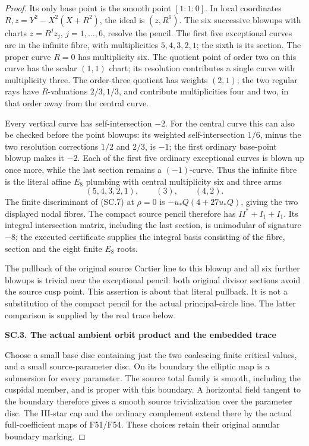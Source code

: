 \begin{proof}
Its only base point is the smooth point \([1:1:0]\). In local coordinates
\(R,z=Y^2-X^2(X+R^2)\), the ideal is \((z,R^6)\). The six successive
blowups with charts \(z=R^jz_j\), \(j=1,\ldots,6\), resolve the
pencil. The first five exceptional curves are in the infinite fibre,
with multiplicities \(5,4,3,2,1\); the sixth is its section. The proper
curve \(R=0\) has multiplicity six. The quotient point of order two on
this curve has the scalar \((1,1)\) chart; its resolution contributes a
single curve with multiplicity three. The order-three quotient has
weights \((2,1)\); the two regular rays have \(R\)-valuations
\(2/3,1/3\), and contribute multiplicities four and two, in that order
away from the central curve.

Every vertical curve has self-intersection \(-2\). For the central
curve this can also be checked before the point blowups: its weighted
self-intersection \(1/6\), minus the two resolution corrections
\(1/2\) and \(2/3\), is \(-1\); the first ordinary base-point blowup
makes it \(-2\). Each of the first five ordinary exceptional curves
is blown up once more, while the last section remains a \((-1)\)-curve.
Thus the infinite fibre is the literal affine \(E_8\) plumbing with
central multiplicity six and three arms
\[
 (5,4,3,2,1),\qquad(3),\qquad(4,2).                  \tag{SC.9}
\]
The finite discriminant of (SC.7) at \(\rho=0\) is
\(-u_*Q(4+27u_*Q)\), giving the two displayed nodal fibres. The compact
source pencil therefore has \(II^*+I_1+I_1\). Its integral intersection
matrix, including the last section, is unimodular of signature \(-8\);
the executed certificate supplies the integral basis consisting of the
fibre, section and the eight finite \(E_8\) roots.

The pullback of the original source Cartier line to this blowup and all
six further blowups is trivial near the exceptional pencil: both original
divisor sections avoid the source cusp point. This assertion is about
that literal pullback. It is not a substitution of the compact pencil
for the actual principal-circle line. The latter comparison is supplied
by the real trace below.

\par

\medskip\noindent\textbf{SC.3. The actual ambient orbit product and the embedded trace}

\par\nobreak

Choose a small base disc containing just the two coalescing finite
critical values, and a small source-parameter disc. On its boundary the
elliptic map is a submersion for every parameter. The source total family
is smooth, including the cuspidal member, and is proper with this boundary.
A horizontal field tangent to the boundary therefore gives a smooth
source trivialization over the parameter disc. The III-star cap and the
ordinary complement extend there by the actual full-coefficient maps of
F51/F54. These choices retain their original annular boundary marking.


\end{proof}
